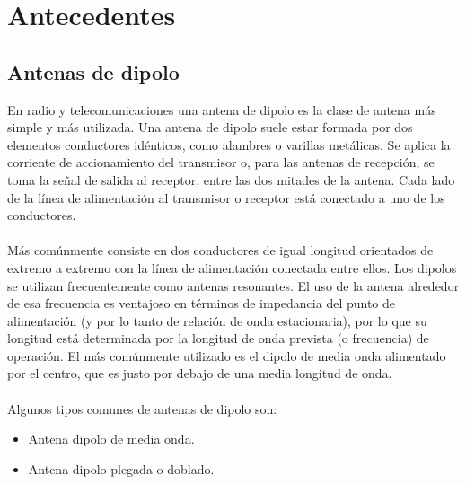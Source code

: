 \documentclass[12pt,letterpaper]{article}
\begin{document}


\newpage
\tableofcontents

\newpage
\section{Antecedentes}
\subsection{Antenas de dipolo}
En radio y telecomunicaciones una antena de dipolo es la clase de antena más 
simple y más utilizada. Una antena de dipolo suele estar formada por dos 
elementos conductores idénticos, como alambres o varillas metálicas. Se aplica 
la corriente de accionamiento del transmisor o, para las antenas de recepción, se toma la 
señal de salida al receptor, entre las dos mitades de la antena. Cada lado de la línea 
de alimentación al transmisor o receptor está conectado a uno de los conductores.
\\ \\
Más comúnmente consiste en dos conductores de igual longitud orientados de extremo a 
extremo con la línea de alimentación conectada entre ellos. Los dipolos se utilizan 
frecuentemente como antenas resonantes. El uso de la antena alrededor de esa 
frecuencia es ventajoso en términos de impedancia del punto de alimentación (y por lo tanto 
de relación de onda estacionaria), por lo que su longitud está determinada por la longitud 
de onda prevista (o frecuencia) de operación. El más comúnmente utilizado es el dipolo 
de media onda alimentado por el centro, que es justo por debajo de una media longitud de 
onda. 
\\ \\
Algunos tipos comunes de antenas de dipolo son:
\begin{itemize}
    \item Antena dipolo de media onda.
    \item Antena dipolo plegada o doblado.
\end{itemize}
\end{document}
